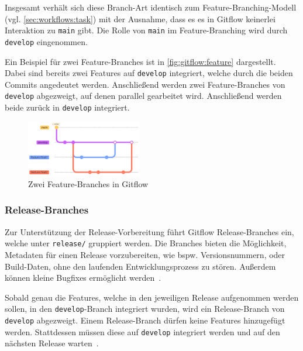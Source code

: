 Insgesamt verhält sich diese Branch\hyp Art identisch zum Feature\hyp Branching\hyp Modell (vgl. \autoref{sec:workflows:task}) mit der Ausnahme, dass es es in Gitflow keinerlei Interaktion zu \texttt{main} gibt. Die Rolle von \texttt{main} im Feature\hyp Branching wird durch \texttt{develop} eingenommen.

Ein Beispiel für zwei Feature\hyp Branches ist in \autoref{fig:gitflow:feature} dargestellt. Dabei sind bereits zwei Features auf \texttt{develop} integriert, welche durch die beiden Commits angedeutet werden. Anschließend werden zwei Feature\hyp Branches von \texttt{develop} abgezweigt, auf denen parallel gearbeitet wird. Anschließend werden beide zurück in \texttt{develop} integriert.

\begin{figure}
    \includegraphics[width=0.45\textwidth]{src/assets/diagrams/gitflow/feature.pdf}
    \caption{Zwei Feature-Branches in Gitflow}
    \label{fig:gitflow:feature}
\end{figure}


\subsubsection{Release-Branches}

Zur Unterstützung der Release\hyp Vorbereitung führt Gitflow Release\hyp Branches ein, welche unter \texttt{release/} gruppiert werden. Die Branches bieten die Möglichkeit, Metadaten für einen Release vorzubereiten, wie bspw. Versionsnummern, oder Build-Daten, ohne den laufenden Entwicklungsprozess zu stören. Außerdem können kleine Bugfixes ermöglicht werden~\cite{driessenSuccessfulGitBranching2010}.

Sobald genau die Features, welche in den jeweiligen Release aufgenommen werden sollen, in den \texttt{develop}-Branch integriert wurden, wird ein Release\hyp Branch von \texttt{develop} abgezweigt. Einem Release\hyp Branch dürfen keine Features hinzugefügt werden. Stattdessen müssen diese auf \texttt{develop} integriert werden und auf den nächsten Release warten~\cite{driessenSuccessfulGitBranching2010}.

